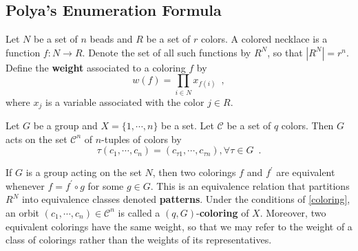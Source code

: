 
\chapter{}

\section{Polya's Enumeration Formula}

\begin{definition}
	\cite[85]{Aigner2007}
	Let $N$ be a set of $n$ beads and $R$ be a set of $r$ colors. A colored necklace is
	a function $f : N \to R$. Denote the set of all such functions by $R^N$, so that
	$|R^N| = r^n$. Define the \textbf{weight} associated to a coloring $f$ by
	\begin{equation}
		w(f) = \prod_{i \in N} x_{f(i)} \enspace,
	\end{equation}
	where $x_j$ is a variable associated with the color $j \in R$.
\end{definition}

\begin{proposition}
	\label{coloring}
	\cite[110]{Rotman1967}
	Let $G$ be a group and $X = \{ 1, \cdots, n \}$ be a set. Let $\mathcal{C}$ be a set
	of $q$ colors. Then $G$ acts on the set $\mathcal{C}^n$ of $n$-tuples of colors by
	\begin{equation}
		\tau(c_1, \cdots, c_n) = (c_{\tau 1}, \cdots, c_{\tau n}),
		\forall \tau \in G \enspace.
	\end{equation}
\end{proposition}

\begin{proposition}
	\cite[85]{Aigner2007}
	\cite[110]{Rotman1967}
	If $G$ is a group acting on the set $N$, then two colorings $f$ and $f^\prime$
	are equivalent whenever $f = f^\prime \circ g$ for some $g \in G$. This is an
	equivalence relation that partitions $R^N$ into equivalence classes denoted
	\textbf{patterns}. Under the conditions of \ref{coloring}, an orbit
	$(c_1, \cdots, c_n) \in \mathcal{C}^n$ is called a $(q, G)$-\textbf{coloring} of $X$.
	Moreover, two equivalent colorings have the same weight, so that we may refer to
	the weight of a class of colorings rather than the weights of its representatives.
\end{proposition}

